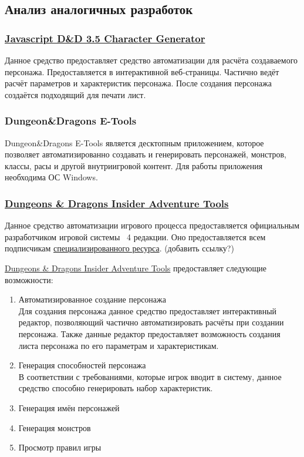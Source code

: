 \subsection{Анализ аналогичных разработок}


\subsubsection{\href{http://www.pathguy.com/cg35.htm}{Javascript D\&D 3.5 Character Generator}}
Данное средство предоставляет средство автоматизации для расчёта создаваемого персонажа. Предоставляется в интерактивной веб-страницы. Частично ведёт расчёт параметров и характеристик персонажа. После создания персонажа создаётся подходящий для печати лист.


\subsubsection{Dungeon\&Dragons E-Tools}
Dungeon\&Dragons E-Tools является десктопным приложением, которое позволяет автоматизированно создавать и генерировать персонажей, монстров, классы, расы и другой внутриигровой контент. Для работы приложения необходима ОС Windows.


\subsubsection{\href{http://www.wizards.com/dnd/Tool.aspx?x=dnd/4new/tool/adventuretools}{Dungeons \& Dragons Insider Adventure Tools}}
Данное средство автоматизации игрового процесса предоставляется официальным разработчиком игровой системы \dnd\ 4 редакции. Оно предоставляется всем подписчикам \href{http://www.wizards.com/dnd}{специализированного ресурса}. (добавить ссылку?)

\href{http://www.wizards.com/dnd/Tool.aspx?x=dnd/4new/tool/adventuretools}{Dungeons \& Dragons Insider Adventure Tools} предоставляет следующие возможности:
\begin{enumerate}
\item Автоматизированное создание персонажа\\
Для создания персонажа данное средство предоставляет интерактивный редактор, позволяющий частично автоматизировать расчёты при создании персонажа. Также данные редактор предоставляет возможность создания листа персонажа по его параметрам и характеристикам.
\item Генерация способностей персонажа\\
В соответствии с требованиями, которые игрок вводит в систему, данное средство способно генерировать набор характеристик.
\item Генерация имён персонажей
\item Генерация монстров
\item Просмотр правил игры
\end{enumerate}

